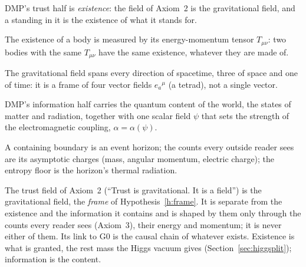 \begin{hypothesis}\label{h:exist}
DMP's trust half is \emph{existence}: the field of Axiom~2 is the gravitational field, and a standing in it is the existence of what it
stands for. \tagH
\end{hypothesis}

\begin{hypothesis}\label{h:energy}
The existence of a body is measured by its energy-momentum tensor $T_{\mu\nu}$: two bodies with the same $T_{\mu\nu}$ have the same
existence, whatever they are made of. \tagH
\end{hypothesis}

\begin{hypothesis}\label{h:frame}
The gravitational field spans every direction of spacetime, three of space and one of time: it is a frame of four vector fields
$e_a{}^{\mu}$ (a tetrad), not a single vector. \tagH
\end{hypothesis}

\begin{hypothesis}\label{h:info}
DMP's information half carries the quantum content of the world, the states of matter and radiation, together with one scalar field
$\psi$ that sets the strength of the electromagnetic coupling, $\alpha=\alpha(\psi)$. \tagH
\end{hypothesis}

\begin{hypothesis}\label{h:horizon}
A containing boundary is an event horizon; the counts every outside reader sees are its asymptotic charges (mass, angular momentum,
electric charge); the entropy floor is the horizon's thermal radiation. \tagH
\end{hypothesis}

\begin{hypothesisprime}
The trust field of Axiom~2 (``Trust is gravitational. It is a field'') is the gravitational field, the \emph{frame} of
Hypothesis~\ref{h:frame}. It is separate from the existence and the information it contains and is shaped by them only through the counts
every reader sees (Axiom~3), their energy and momentum; it is never either of them. Its link to G0 is the causal chain of whatever exists.
Existence is what is granted, the rest mass the Higgs vacuum gives (Section~\ref{sec:higgsplit}); information is the content. \tagH
\end{hypothesisprime}


